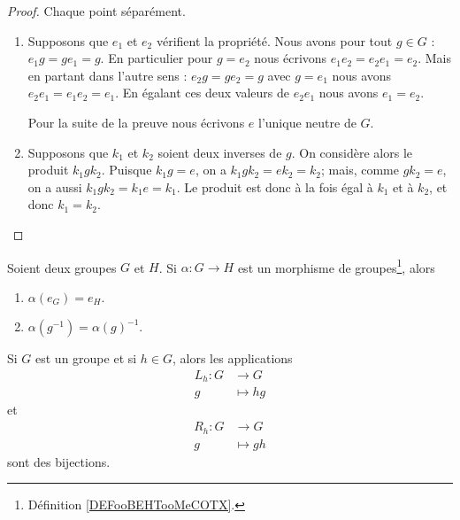 \begin{proof}
	Chaque point séparément.
	\begin{enumerate}
		\item
		      Supposons que \( e_1\) et \( e_2\) vérifient la propriété. Nous avons pour tout \( g\in G\) : \( e_1g=ge_1=g\). En particulier pour \( g=e_2\) nous écrivons \( e_1e_2=e_2e_1=e_2\). Mais en partant dans l'autre sens : \( e_2g=ge_2=g\) avec \( g=e_1\) nous avons \( e_2e_1=e_1e_2=e_1\). En égalant ces deux valeurs de \( e_2e_1\) nous avons \( e_1=e_2\).

		      Pour la suite de la preuve nous écrivons \( e\) l'unique neutre de \( G\).

		\item
		      Supposons que \( k_1\) et \( k_2\) soient deux inverses de \( g\). On considère alors le produit \( k_1 g k_2 \). Puisque \(k_1 g = e \), on a \( k_1 g k_2 = e k_2 = k_2 \); mais, comme \(g k_2 = e \), on a aussi \( k_1 g k_2 = k_1 e = k_1 \). Le produit est donc à la fois égal à \( k_1 \) et à \( k_2 \), et donc \( k_1 = k_2 \).
	\end{enumerate}
\end{proof}

\begin{lemma}       \label{LEMooWYLRooNOdZnp}
	Soient deux groupes \( G\) et \( H\). Si \( \alpha\colon G\to H\) est un morphisme de groupes\footnote{Définition \ref{DEFooBEHTooMeCOTX}.}, alors
	\begin{enumerate}
		\item
		      \( \alpha(e_G)=e_H\).
		\item
		      \( \alpha(g^{-1})=\alpha(g)^{-1}\).
	\end{enumerate}
\end{lemma}

\begin{lemma}       \label{LEMooBIBFooBHxFYC}
	Si \( G\) est un groupe et si \( h\in G\), alors les applications
	\begin{equation}
		\begin{aligned}
			L_h\colon G & \to G      \\
			g           & \mapsto hg
		\end{aligned}
	\end{equation}
	et
	\begin{equation}
		\begin{aligned}
			R_h\colon G & \to G      \\
			g           & \mapsto gh
		\end{aligned}
	\end{equation}
	sont des bijections.
\end{lemma}

